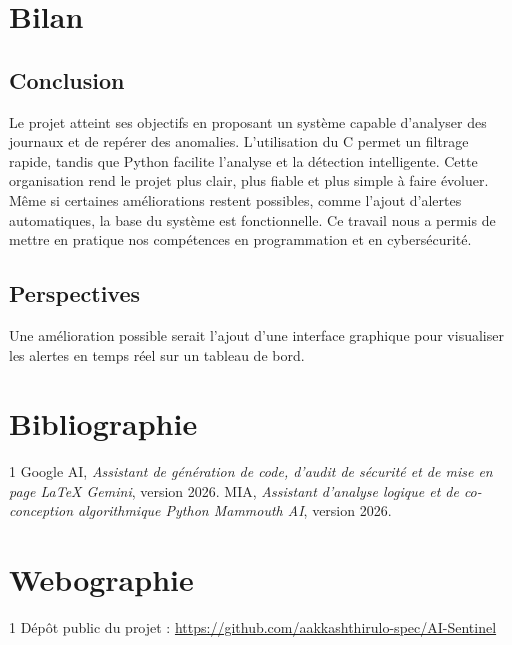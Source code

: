 \documentclass[a4paper, 12pt, twoside]{article}
\begin{document}
\section{Bilan}
\subsection{Conclusion}
Le projet atteint ses objectifs en proposant un système capable d’analyser des journaux et de repérer des anomalies. L’utilisation du C permet un filtrage rapide, tandis
que Python facilite l’analyse et la détection intelligente. Cette organisation rend le projet plus clair, plus fiable et plus simple à faire évoluer. Même si certaines améliorations restent possibles, comme l’ajout d’alertes automatiques, la base du système est fonctionnelle. Ce travail nous a permis de mettre en pratique nos compétences en programmation et en cybersécurité.

\subsection{Perspectives}
Une amélioration possible serait l’ajout d’une interface graphique pour visualiser
les alertes en temps réel sur un tableau de bord.

\newpage

\section{Bibliographie}
\begin{thebibliography}{1}
    Google AI, \emph{Assistant de génération de code, d'audit de sécurité et de mise en page \LaTeX{} Gemini}, version 2026.
    MIA, \emph{Assistant d'analyse logique et de co-conception algorithmique Python Mammouth AI}, version 2026.
\end{thebibliography}

\newpage

\section{Webographie}
\begin{thebibliography}{1}
    Dépôt public du projet : \url{https://github.com/aakkashthirulo-spec/AI-Sentinel}
\end{thebibliography}
\end{document}
